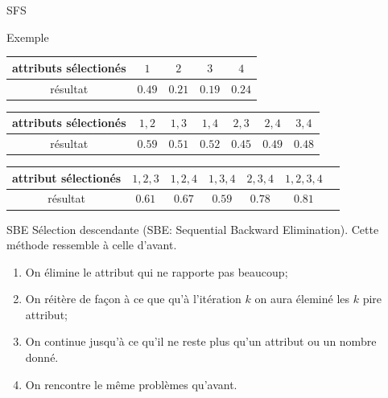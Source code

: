 \documentclass[8pt]{beamer}
\begin{document}
	\begin{frame}{SFS}
		\begin{block}{Exemple}
			\begin{center}
				\begin{longtable}{c c c c c}
					\toprule
					attributs sélectionés & $1$ & $2$ & $3$ & $4$\\
					\midrule
					résultat& \boldmath $0.49$ & $0.21$ & $0.19$ &$0.24$\\
					\bottomrule
				\end{longtable}
				\begin{longtable}{c c c c c c c}
					\toprule
					attributs sélectionés & $1,2$ & $1,3$ & $1,4$ & $2,3$ & $2,4$ & $3,4$\\
					\midrule
					résultat & \boldmath$0.59$ & $0.51$ & $0.52$ & $0.45$ & $0.49$ & $0.48$\\
					\bottomrule
				\end{longtable}
				\begin{longtable}{c c c c c c c}
					\toprule
					attribut sélectionés & $1,2,3$ & $1,2,4$ & $1,3,4$ & $2,3,4$ & $1,2,3,4$\\
					\midrule
					résultat & $0.61$ & $0.67$ & $0.59$ & $0.78$ & \boldmath$0.81$\\
					\bottomrule
				\end{longtable}
			\end{center}
		\end{block}
	\end{frame}

	\begin{frame}{SBE}
		Sélection descendante (SBE\@: Sequential Backward Elimination).
		Cette méthode ressemble à celle d'avant.
		\begin{enumerate}
		\item<1-> On élimine le attribut qui ne rapporte pas beaucoup;
		\item<2-> On réitère de façon à ce que qu'à l'itération $k$ on aura éleminé les $k$ pire attribut;
		\item<3-> On continue jusqu'à ce qu'il ne reste plus qu'un attribut ou un nombre donné.
		\item <4-> On rencontre le même problèmes qu'avant.
		\end{enumerate}
	\end{frame}
\end{document}
